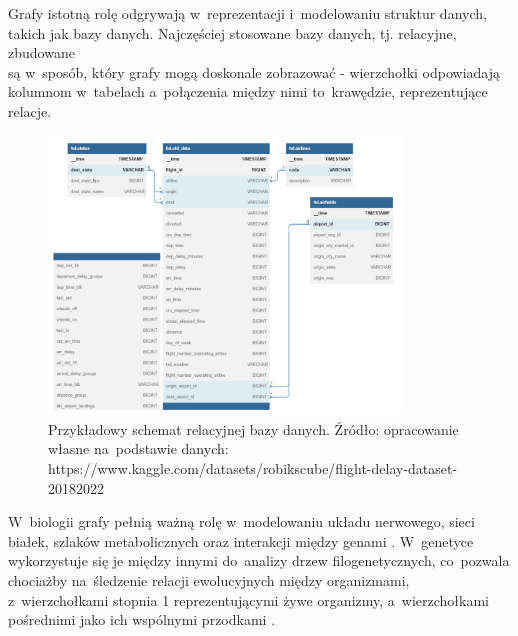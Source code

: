 Grafy istotną rolę odgrywają w~reprezentacji i~modelowaniu struktur danych, takich jak bazy danych.
Najczęściej stosowane bazy danych, tj. relacyjne, zbudowane \\ są w~sposób, który grafy mogą doskonale zobrazować -
wierzchołki odpowiadają kolumnom w~tabelach a~połączenia między nimi to~krawędzie, reprezentujące relacje.

\begin{figure}[ht]
	\centering
	\includegraphics[height=7.4cm]{resources/introduction/images/database.png}
	\caption{Przykładowy schemat relacyjnej bazy danych.
		Źródło: opracowanie \\ własne na~podstawie danych:
		https://www.kaggle.com/datasets/robikscube/flight-delay-dataset-20182022}
    \label{Fig:intro-2}
\end{figure}
\FloatBarrier

\clearpage

W~biologii grafy pełnią ważną rolę w~modelowaniu układu nerwowego, sieci \\ białek,
szlaków metabolicznych oraz interakcji między genami \cite{Chung2021}.
W~genetyce wykorzystuje się je między innymi do~analizy drzew filogenetycznych,
co~pozwala chociażby na~śledzenie relacji ewolucyjnych między organizmami,
z~wierzchołkami stopnia 1 reprezentującymi żywe organizmy,
a~wierzchołkami pośrednimi jako ich wspólnymi przodkami \cite{Erciyes2023}.

